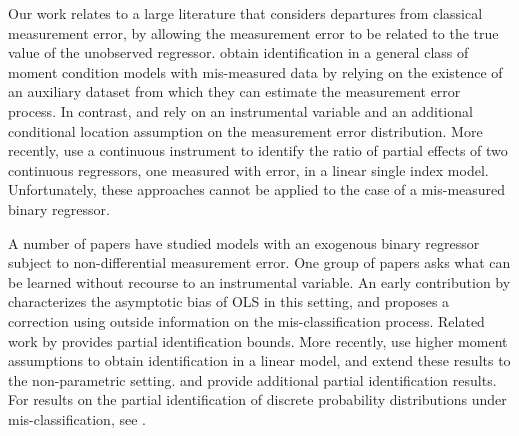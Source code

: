 Our work relates to a large literature that considers departures from classical measurement error, by allowing the measurement error to be related to the true value of the unobserved regressor.
\cite{ChenHongTamer} obtain identification in a general class of moment condition models with mis-measured data by relying on the existence of an auxiliary dataset from which they can estimate the measurement error process.
In contrast, \cite{HuSchennach} and \cite{song2015} rely on an instrumental variable and an additional conditional location assumption on the measurement error distribution. 
More recently, \cite{HuShiuWoutersen} use a continuous instrument to identify the ratio of partial effects of two continuous regressors, one measured with error, in a linear single index model.
Unfortunately, these approaches cannot be applied to the case of a mis-measured binary regressor.

A number of papers have studied models with an exogenous binary regressor subject to non-differential measurement error.
One group of papers asks what can be learned without recourse to an instrumental variable.
An early contribution by \cite{Aigner} characterizes the asymptotic bias of OLS in this setting, and proposes a correction using outside information on the mis-classification process.
Related work by \cite{Bollinger} provides partial identification bounds.
More recently, \cite{ChenHuLewbel} use higher moment assumptions to obtain identification in a linear model, and \cite{ChenHuLewbel2} extend these results to the non-parametric setting. 
\cite{HasseltBollinger} and \cite{BollingerHasseltWP} provide additional partial identification results.
For results on the partial identification of discrete probability distributions under mis-classification, see \cite{molinari}.

